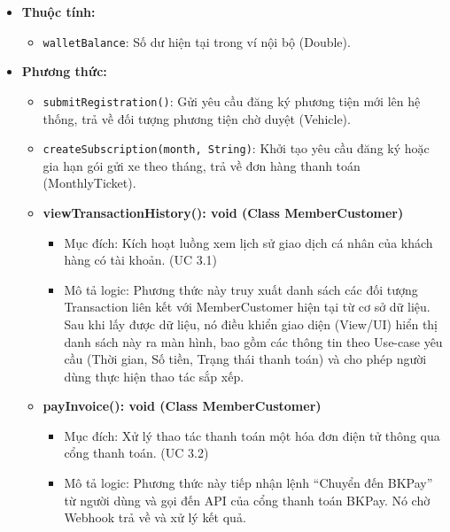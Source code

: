 \begin{itemize}
    \item \textbf{Thuộc tính:}
    \begin{itemize}
        \item \texttt{walletBalance}: Số dư hiện tại trong ví nội bộ (Double).
    \end{itemize}
    \item \textbf{Phương thức:}
    \begin{itemize}
        \item \texttt{submitRegistration()}: Gửi yêu cầu đăng ký phương tiện mới lên hệ thống, trả về đối tượng phương tiện chờ duyệt (Vehicle).
        \item \texttt{createSubscription(month, String)}: Khởi tạo yêu cầu đăng ký hoặc gia hạn gói gửi xe theo tháng, trả về đơn hàng thanh toán (MonthlyTicket).
        
        \item \textbf{viewTransactionHistory(): void (Class MemberCustomer)}
        \begin{itemize}
            \item Mục đích: Kích hoạt luồng xem lịch sử giao dịch cá nhân của khách hàng có tài khoản. (UC 3.1)

            \item Mô tả logic: Phương thức này truy xuất danh sách các đối tượng Transaction liên kết với MemberCustomer hiện tại từ cơ sở dữ liệu. Sau khi lấy được dữ liệu, nó điều khiển giao diện (View/UI) hiển thị danh sách này ra màn hình, bao gồm các thông tin theo Use-case yêu cầu (Thời gian, Số tiền, Trạng thái thanh toán) và cho phép người dùng thực hiện thao tác sắp xếp.
        \end{itemize}

        \item \textbf{payInvoice(): void (Class MemberCustomer)}
        \begin{itemize}     
            \item Mục đích: Xử lý thao tác thanh toán một hóa đơn điện tử thông qua cổng thanh toán. (UC 3.2)

            \item Mô tả logic: Phương thức này tiếp nhận lệnh ``Chuyển đến BKPay'' từ người dùng và gọi đến API của cổng thanh toán BKPay. Nó chờ Webhook trả về và xử lý kết quả.      
        \end{itemize}
    \end{itemize}
\end{itemize}


